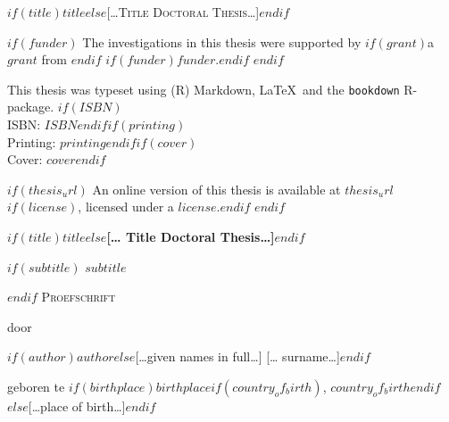 \documentclass[$if(fontsize)$$fontsize$,$endif$$if(lang)$$babel-lang$,$endif$$if(papersize)$$papersize$paper,twoside,$endif$$for(classoption)$$classoption$$sep$,$endfor$]{$documentclass$} %
\begin{document}
\frontmatter
\thispagestyle{empty}
\def\drop{.1\textheight}

\vspace*{\drop}
\begin{center}
\Huge \textsc{$if(title)$$title$$else$[…Title Doctoral Thesis…]$endif$}
\end{center}

\clearpage
\thispagestyle{empty}
\vspace*{\fill}
\begingroup %
\small
\setlength{\parskip}{\baselineskip} %
\setlength\parindent{0pt} %
$if(funder)$
The investigations in this thesis were supported by $if(grant)$a $grant$ from $endif$
$if(funder)$$funder$.$endif$
$endif$

This thesis was typeset using (R) Markdown, \LaTeX\ and the \verb+bookdown+ R-package.
$if(ISBN)$\\ ISBN: $ISBN$$endif$$if(printing)$\\ Printing: $printing$$endif$$if(cover)$\\ Cover: $cover$$endif$

$if(thesis_url)$
An online version of this thesis is available at $thesis_url$$if(license)$, licensed under a $license$.$endif$
$endif$
\endgroup

\clearpage
\thispagestyle{empty}
\vspace*{\drop}
\begin{center}
\Huge\textbf{$if(title)$$title$$else$[… Title Doctoral Thesis…]$endif$}\par
$if(subtitle)$
\vspace{\baselineskip}
\Large\textit{$subtitle$}\par
$endif$
\vfill %
\large \textsc{Proefschrift}\par
\vspace{\baselineskip}
\par %
\vspace{\baselineskip}
{\large door}\par
\vspace{\baselineskip}
{\Large $if(author)$$author$$else$[…given names in full…] [… surname…]$endif$}\par
\vspace{\baselineskip}
{\large geboren te $if(birthplace)$$birthplace$$if(country_of_birth)$, $country_of_birth$$endif$$else$[…place of birth…]$endif$}
\end{center}
\end{document}
